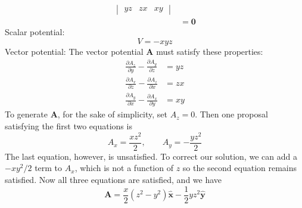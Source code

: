 \documentclass[a4paper]{article}
\begin{document}
\begin{enumerate}[label=(\alph*)]
\begin{align*}
\begin{vmatrix}
			yz & zx & xy
		\end{vmatrix} \\ 
					  & = \pmb{0}
	\end{align*}
	Scalar potential:
	\[
		V = -xyz  
	\]
	Vector potential:
	The vector potential \( \pmb{A} \) must satisfy these properties:
	\begin{align*}
		\frac{\partial A_{z}}{\partial y} - \frac{\partial A_{y}}{\partial z} & = yz \\
		\frac{\partial A_{x}}{\partial z} - \frac{\partial A_{z}}{\partial x} & = zx \\ 
		\frac{\partial A_{y}}{\partial x} - \frac{\partial A_{x}}{\partial y} & = xy
	\end{align*}
	To generate \( \pmb{A} \), for the sake of simplicity, set \( A_{z} = 0 \). Then one proposal satisfying the first two equations is
	\[
		A_{x} = \frac{xz^{2}}{2}, \qquad A_{y} = -\frac{yz^{2}}{2} 
	\]
	The last equation, however, is unsatisfied. To correct our solution, we can add a \( -xy^{2} / 2 \) term to \( A_{x} \), which is not a function of \( z \) so the second equation remains satisfied. Now all three equations are satisfied, and we have
	\[
		\pmb{A} = \frac{x}{2}\!\left( z^{2} - y^{2} \right)\pmb{\hat{x}} - \frac{1}{2
}yz^{2}\pmb{\hat{y}}
	\]
\end{enumerate}

\end{document}
